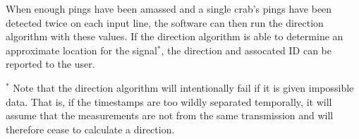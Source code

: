 \documentclass[12pt]{article}
\begin{document}
When enough pings have been amassed and a single crab's pings have been
detected twice on each input line, the software can then run the direction
algorithm with these values.
If the direction algorithm is able to determine an approximate location for
the signal$^*$, the direction and assocated ID can be reported to the user.

$^*$ Note that the direction algorithm will intentionally fail if it is given
impossible data.
That is, if the timestamps are too wildly separated temporally, it will assume
that the measurements are not from the same transmission and will therefore
cease to calculate a direction.

\newpage

\printglossary
\end{document}
